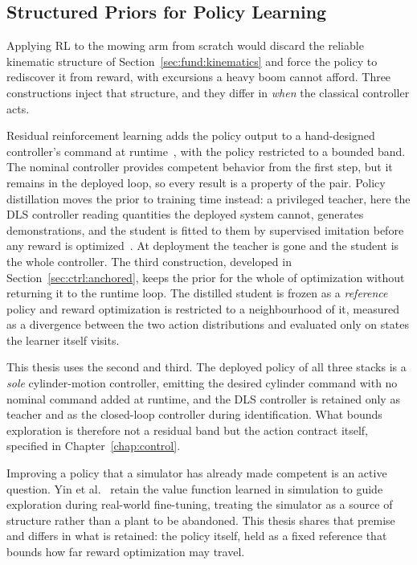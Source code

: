 \subsection{Structured Priors for Policy Learning}
\label{sec:fund:prior}

Applying RL to the mowing arm from scratch would discard the reliable
kinematic structure of Section~\ref{sec:fund:kinematics} and force the policy
to rediscover it from reward, with excursions a heavy boom cannot afford.
Three constructions inject that structure, and they differ in \emph{when} the
classical controller acts.

Residual reinforcement learning adds the policy output to a hand-designed
controller's command at
runtime~\cite{johannink2019residual,silver2018residual}, with the policy
restricted to a bounded band. The nominal controller provides competent
behavior from the first step, but it remains in the deployed loop, so every
result is a property of the pair. Policy distillation moves the prior to
training time instead: a privileged teacher, here the DLS controller reading
quantities the deployed system cannot, generates demonstrations, and the
student is fitted to them by supervised imitation before any reward is
optimized~\cite{ross2011reduction}. At deployment the teacher is gone and the
student is the whole controller. The third construction, developed in
Section~\ref{sec:ctrl:anchored}, keeps the prior for the whole of
optimization without returning it to the runtime loop. The distilled student
is frozen as a \emph{reference} policy and reward optimization is restricted
to a neighbourhood of it, measured as a divergence between the two action
distributions and evaluated only on states the learner itself visits.

This thesis uses the second and third. The deployed policy of all three
stacks is a \emph{sole} cylinder-motion controller, emitting the desired
cylinder command with no nominal command added at runtime, and the DLS
controller is retained only as teacher and as the closed-loop controller
during identification. What bounds exploration is therefore not a residual
band but the action contract itself, specified in
Chapter~\ref{chap:control}.

Improving a policy that a simulator has already made competent is an active
question. Yin et al.~\cite{yin2025rapidly} retain the value function learned
in simulation to guide exploration during real-world fine-tuning, treating
the simulator as a source of structure rather than a plant to be abandoned.
This thesis shares that premise and differs in what is retained: the policy
itself, held as a fixed reference that bounds how far reward optimization may
travel.

